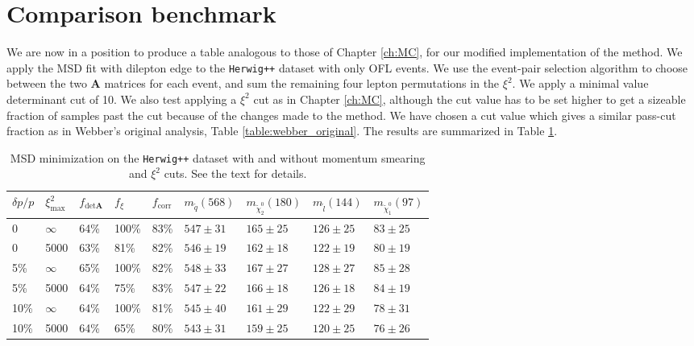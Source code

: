 \documentclass[twoside,english]{uiofysmaster}
\begin{document}
\section{Comparison benchmark}
We are now in a position to produce a table analogous to those of Chapter \ref{ch:MC}, for our modified implementation of the method. We apply the MSD fit with dilepton edge to the {\tt Herwig++} dataset with only OFL events. We use the event-pair selection algorithm to choose between the two $\mathbf{A}$ matrices for each event, and sum the remaining four lepton permutations in the $\xi^2$. We apply a minimal value determinant cut of 10. We also test applying a $\xi^2$ cut as in Chapter \ref{ch:MC}, although the cut value has to be set higher to get a sizeable fraction of samples past the cut because of the changes made to the method. We have chosen a cut value which gives a similar pass-cut fraction as in Webber's original analysis, Table \ref{table:webber_original}. The results are summarized in Table \ref{table:MD_fit_table}.
\begin{table}[hbt]
	\centering
	\begin{tabular}{| l | l | l | l | l  || l | l | l | l |}
		\hline
		$\delta p/p$ &  $\xi^2_\mathrm{max}$ & $f_{\mathrm{det}\mathbf{A}}$ &  $f_\xi$ & $f_\mathrm{corr}$ & $m_{\tilde q} (568)$ & $m_{\tilde \chi_2^0} (180)$ & $m_{\tilde l} (144)$ & $m_{\tilde \chi_1^0} (97)$ \\
		\hline \hline
		0     & 	$\infty$ & 64\%  &	100\%	& 83\%	& $547 \pm 31$	&	$165 \pm 25$	&	$126 \pm 25$	& 	$83 \pm 25$	\\
		0     &		5000     & 63\%  &		81\%	& 82\%    & $546 \pm 19$	&	$162 \pm 18$	&	$122 \pm 19$	&	$80 \pm 19$	\\
		5\%   &	$\infty$   & 65\%  &	100\%	& 82\%    & $548 \pm 33$	& 	$167 \pm 27$	&	$128 \pm 27$	&	$85 \pm 28$ \\
		5\%   &	5000       & 64\%  &		75\%	& 83\%      & $547 \pm 22$	&	$166 \pm 18$	& 	$126 \pm 18$	&	$84 \pm 19$	\\
		10\%  &	$\infty$   & 64\%  &100\%	& 81\%      & $545 \pm 40$	&	$161 \pm 29$	&	$122 \pm 29$	&	$78 \pm 31$	\\
		10\%  &	5000       & 64\%  &		65\%	& 80\%      & $543 \pm 31$	& 	$159 \pm 25$	&	$120 \pm 25$	&	$76 \pm 26$ \\
		\hline
	\end{tabular}
	\caption{MSD minimization on the {\tt Herwig++} dataset with and without momentum smearing and $\xi^2$ cuts. See the text for details.}
	\label{table:MD_fit_table}
\end{table}
\end{document}
